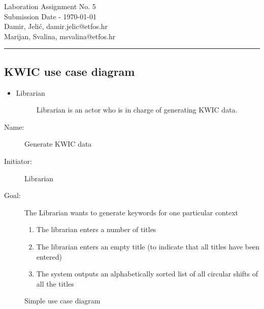 \documentclass[11pt,a4paper]{article}
\begin{document}
\large
Laboration Assignment No. 5\\
Submission Date - \yyyymmdddate \today \\
Damir, Jelić, damir.jelic@etfos.hr \\
Marijan, Svalina, msvalina@etfos.hr
\\
\rule{\linewidth}{0.1mm}
\setcounter{section}{5}
\begin{description}
\subsection{KWIC use case diagram}
    \item[Actors:] \hfil
    \begin{itemize}
    \item
        Librarian
        \begin{description}
            \item[] Librarian is an actor who is in charge of generating KWIC data.
        \end{description}
    \end{itemize}

    \item[Use cases:] \hfil
        \begin{description}
            \item[Name:] Generate KWIC data
            \item[Initiator:] Librarian
            \item[Goal:]The Librarian wants to generate keywords for one particular context
                 \begin{enumerate}
                    \item The librarian enters a number of titles
                    \item The librarian enters an empty title 
                    (to indicate that all titles have been entered) 
                    \item The system outputs an alphabetically sorted list 
                    of all circular shifts of all the titles
                 \end{enumerate}
        \end{description}
        \item[Use Case Diagram:] \hfil
     \begin{figure}[htb]
         \begin{center}
             \setlength\fboxsep{0pt}
             \caption{Simple use case diagram}
             \label{fig:class_diag}
        \end{center}
\end{figure}



\end{description}
\end{document}
